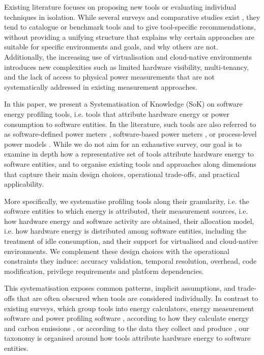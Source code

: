 \documentclass[
  acmsmall,
  screen,
  review,
  xcolor={dvipsnames,usenames}
]{acmart}
\begin{document}
Existing literature focuses on proposing new tools or evaluating individual techniques in isolation. While several surveys and comparative studies exist \cite{wysockiMethodsImprovingSoftware2025,jayExperimentalComparisonSoftwarebased2023,pathaniaCalculatingSoftwaresEnergy2025,aneggiMeasuringSoftwareEnergy2026}, they tend to catalogue or benchmark tools and to give tool-specific recommendations, without providing a unifying structure that explains why certain approaches are suitable for specific environments and goals, and why others are not. Additionally, the increasing use of virtualisation and cloud-native environments introduces new complexities such as limited hardware visibility, multi-tenancy, and the lack of access to physical power measurements that are not systematically addressed in existing measurement approaches.

In this paper, we present a Systematisation of Knowledge (SoK) on software energy profiling tools, i.e. tools that attribute hardware energy or power consumption to software entities. In the literature, such tools are also referred to as software-defined power meters \cite{colmantBitWattsProcesslevelPower2014,fieniSmartWattsSelfCalibratingSoftwareDefined2020,fieniPowerAPIPythonFramework2024}, software-based power meters \cite{jayExperimentalComparisonSoftwarebased2023}, or process-level power models \cite{cadorelProtocolAssessAccuracy2024b}. While we do not aim for an exhaustive survey, our goal is to examine in depth how a representative set of tools attribute hardware energy to software entities, and to organise existing tools and approaches along dimensions that capture their main design choices, operational trade-offs, and practical applicability.

More specifically, we systematise profiling tools along their granularity, i.e. the software entities to which energy is attributed, their measurement sources, i.e. how hardware energy and software activity are obtained, their allocation model, i.e. how hardware energy is distributed among software entities, including the treatment of idle consumption, and their support for virtualised and cloud-native environments. We complement these design choices with the operational constraints they induce: accuracy validation, temporal resolution, overhead, code modification, privilege requirements and platform dependencies.

This systematisation exposes common patterns, implicit assumptions, and trade-offs that are often obscured when tools are considered individually. In contrast to existing surveys, which group tools into energy calculators, energy measurement software and power profiling software \cite{jayExperimentalComparisonSoftwarebased2023}, according to how they calculate energy and carbon emissions \cite{pathaniaCalculatingSoftwaresEnergy2025}, or according to the data they collect and produce \cite{aneggiMeasuringSoftwareEnergy2026}, our taxonomy is organised around how tools attribute hardware energy to software entities.
\end{document}
